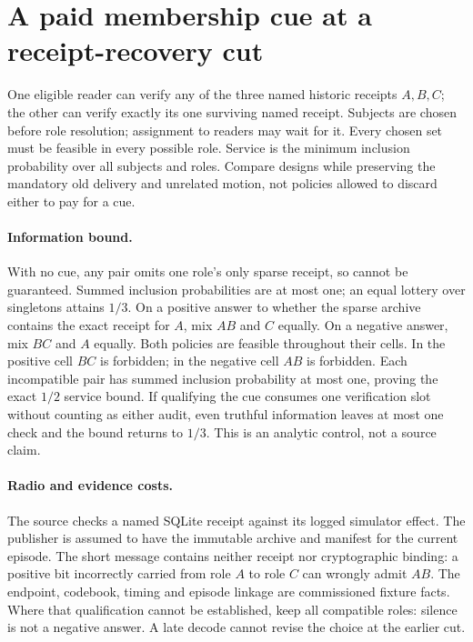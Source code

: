 \documentclass{article}
\begin{document}
\section*{A paid membership cue at a receipt-recovery cut}
One eligible reader can verify any of the three named historic receipts
$A,B,C$; the other can verify exactly its one surviving named receipt.
Subjects are chosen before role resolution; assignment to readers may
wait for it. Every chosen set must be feasible in every possible role.
Service is the minimum inclusion probability over all subjects and roles.
Compare designs while preserving the mandatory old delivery and unrelated
motion, not policies allowed to discard either to pay for a cue.

\paragraph{Information bound.}
With no cue, any pair omits one role's only sparse receipt, so cannot be
guaranteed. Summed inclusion probabilities are at most one; an equal
lottery over singletons attains $1/3$. On a positive answer to whether the
sparse archive contains the exact receipt for $A$, mix $AB$ and $C$
equally. On a negative answer, mix $BC$ and $A$ equally. Both policies are
feasible throughout their cells. In the positive cell $BC$ is forbidden;
in the negative cell $AB$ is forbidden. Each incompatible pair has summed
inclusion probability at most one, proving the exact $1/2$ service bound.
If qualifying the cue consumes one verification slot without counting as
either audit, even truthful information leaves at most one check and the
bound returns to $1/3$. This is an analytic control, not a source claim.

\paragraph{Radio and evidence costs.}
The source checks a named SQLite receipt against its logged simulator
effect. The publisher is assumed to have the immutable archive and
manifest for the current episode. The short message contains neither
receipt nor cryptographic binding: a positive bit incorrectly carried
from role $A$ to role $C$ can wrongly admit $AB$. The endpoint, codebook,
timing and episode linkage are commissioned fixture facts. Where that
qualification cannot be established, keep all compatible roles: silence
is not a negative answer. A late decode cannot revise the choice at the
earlier cut.
\end{document}
